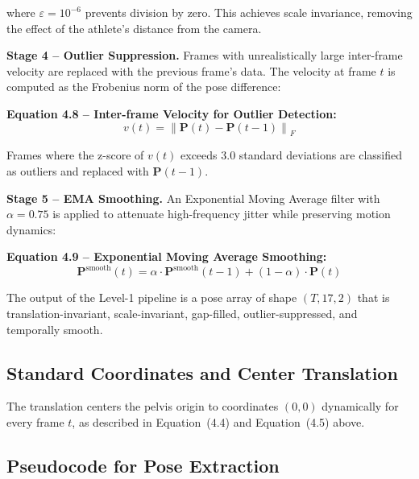\begin{sloppypar}
where $\varepsilon = 10^{-6}$ prevents division by zero. This achieves scale invariance, removing the effect of the athlete's distance from the camera.

\textbf{Stage 4 -- Outlier Suppression.} Frames with unrealistically large inter-frame velocity are replaced with the previous frame's data. The velocity at frame $t$ is computed as the Frobenius norm of the pose difference:

\textbf{Equation 4.8 -- Inter-frame Velocity for Outlier Detection:}
\begin{equation}
v(t) = \left\| \mathbf{P}(t) - \mathbf{P}(t-1) \right\|_F
\tag{4.8}
\end{equation}

Frames where the z-score of $v(t)$ exceeds 3.0 standard deviations are classified as outliers and replaced with $\mathbf{P}(t-1)$.

\textbf{Stage 5 -- EMA Smoothing.} An Exponential Moving Average filter with $\alpha = 0.75$ is applied to attenuate high-frequency jitter while preserving motion dynamics:

\textbf{Equation 4.9 -- Exponential Moving Average Smoothing:}
\begin{equation}
\mathbf{P}^{\text{smooth}}(t) = \alpha \cdot \mathbf{P}^{\text{smooth}}(t-1) + (1 - \alpha) \cdot \mathbf{P}(t)
\tag{4.9}
\end{equation}

The output of the Level-1 pipeline is a pose array of shape $(T, 17, 2)$ that is translation-invariant, scale-invariant, gap-filled, outlier-suppressed, and temporally smooth.

\subsection{Standard Coordinates and Center Translation}
The translation centers the pelvis origin to coordinates $(0, 0)$ dynamically for every frame $t$, as described in Equation~(4.4) and Equation~(4.5) above.

\subsection{Pseudocode for Pose Extraction}


\end{sloppypar}
